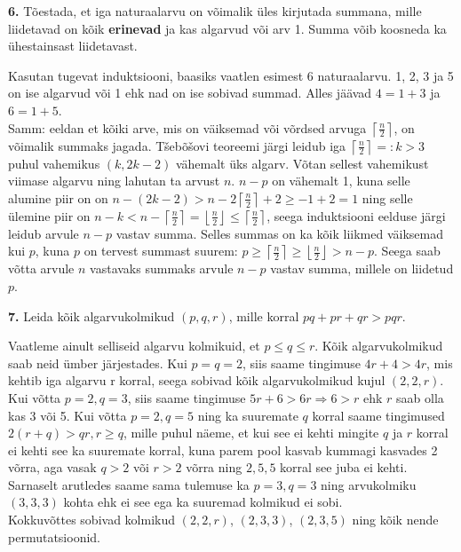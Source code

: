 \documentclass[a4paper, 10pt]{article}
\begin{document}
\bigskip
\pagebreak
\noindent \textbf{6.} Tõestada, et iga naturaalarvu on võimalik üles kirjutada summana, mille liidetavad on kõik {\bf erinevad} ja kas algarvud või arv 1. Summa võib koosneda ka ühestainsast liidetavast. 

\bigskip

Kasutan tugevat induktsiooni, baasiks vaatlen esimest 6 naturaalarvu. 1, 2, 3 ja 5 on ise algarvud või 1 ehk nad on ise sobivad summad. Alles jäävad $4=1+3$ ja $6=1+5$.\\
Samm: eeldan et kõiki arve, mis on väiksemad  või võrdsed arvuga $\left\lceil \frac n2\right\rceil$, on võimalik summaks jagada. Tšebõšovi teoreemi järgi leidub iga $\left\lceil \frac n2\right\rceil=:k>3$ puhul vahemikus $(k,2k-2)$ vähemalt üks algarv. Võtan sellest vahemikust viimase algarvu ning lahutan ta arvust $n$. $n-p$ on vähemalt 1, kuna selle alumine piir on on $n-(2k-2)>n-2\left\lceil \frac n2\right\rceil+2\geq-1+2=1$ ning selle ülemine piir on $n-k<n-\left\lceil \frac n2\right\rceil= \left\lfloor \frac n2\right\rfloor\leq\left\lceil \frac n2\right\rceil$, seega induktsiooni eelduse järgi leidub arvule $n-p$ vastav summa. Selles summas on ka kõik liikmed väiksemad kui $p$, kuna $p$ on tervest summast suurem: $p\geq\left\lceil \frac n2\right\rceil\geq\left\lfloor \frac n2\right\rfloor> n-p$. Seega saab võtta arvule $n$ vastavaks summaks arvule $n-p$ vastav summa, millele on liidetud $p$.

\bigskip

\noindent \textbf{7.} Leida kõik algarvukolmikud $(p,q,r)$, mille korral $pq + pr + qr > pqr$.

\bigskip

Vaatleme ainult selliseid algarvu kolmikuid, et $p\leq q\leq r$. Kõik algarvukolmikud saab neid ümber järjestades. Kui $p=q=2$, siis saame tingimuse $4r+4>4r$, mis kehtib iga algarvu r korral, seega sobivad kõik algarvukolmikud kujul $(2,2,r)$. Kui võtta $p=2,q=3$, siis saame tingimuse $5r+6>6r\Rightarrow 6>r$ ehk $r$ saab olla kas 3 või 5. Kui võtta $p=2,q=5$ ning ka suuremate $q$ korral saame tingimused $2(r+q)>qr,r\geq q$, mille puhul näeme, et kui see ei kehti mingite $q$ ja $r$ korral ei kehti see ka suuremate korral, kuna parem pool kasvab kummagi kasvades 2 võrra, aga vasak $q>2$ või $r>2$ võrra ning $2,5,5$ korral see juba ei kehti. Sarnaselt arutledes saame sama tulemuse ka $p=3,q=3$ ning arvukolmiku $(3,3,3)$ kohta ehk ei see ega ka suuremad kolmikud ei sobi.\\
Kokkuvõttes sobivad kolmikud $(2,2,r)$, $(2,3,3)$, $(2,3,5)$ ning kõik nende permutatsioonid.
\end{document}
